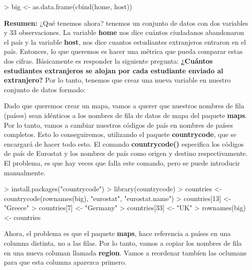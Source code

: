 \documentclass [a4paper] {article}
\begin{document}
\begin{Schunk}
\begin{Sinput}
> big <- as.data.frame(cbind(home, host))
\end{Sinput}
\end{Schunk}

\textbf{Resumen:} ¿Qué tenemos ahora? tenemos un conjunto de datos con dos variables y 33
observaciones. La variable \textbf{home} nos dice cuántos ciudadanos abandonaron el país y la variable 
\textbf{host}, nos dice cuantos estudiantes extranjeros entraron en el país. Entonces, lo que
queremos es hacer una métrica que pueda comparar estas dos cifras. Básicamente es responder
la siguiente pregunta: \textbf{¿Cuántos estudiantes extranjeros se alojan por cada estudiante enviado
al extranjero?}
Por lo tanto, tenemos que crear una nueva variable en nuestro conjunto de datos formado:

\begin{Schunk}
\end{Schunk}

Dado que queremos crear un mapa, vamos a querer que nuestros nombres de fila (países) sean idénticos
a los nombres de fila de datos de mapa del paquete \textbf{maps}. Por lo tanto, vamos a cambiar
nuestros códigos de país en nombres de países completos. Esto lo conseguiremos, utilizando
el paquete \textbf{countrycode}, que se encargará de hacer todo esto. El comando \textbf{countrycode()}
especifica los códigos de país de Eurostat y los nombres de país como origen y destino respectivamente.
El problema, es que hay veces que falla este comando, pero se puede introducir manualmente.

\begin{Schunk}
\begin{Sinput}
> install.packages("countrycode")
> library(countrycode)
> countries <- countrycode(rownames(big), "eurostat", "eurostat.name")
> countries[13] <- "Greece"
> countries[7] <- "Germany"
> countries[33] <- "UK"
> rownames(big) <- countries
\end{Sinput}
\end{Schunk}

Ahora, el problema es que el paquete \textbf{maps}, hace referencia a países en una columna
distinta, no a las filas. Por lo tanto, vamos a copiar los nombres de fila en una nueva columan 
llamada \textbf{region}. Vamos a reordenar tambíen las oclumans para que esta columna aparezca
primero.
\end{document}
